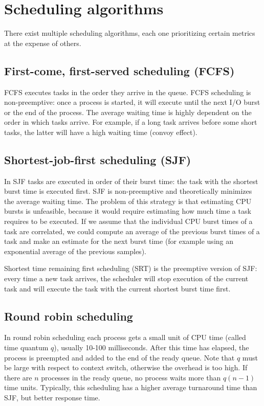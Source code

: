 \section{Scheduling algorithms}
There exist multiple scheduling algorithms, each one prioritizing certain metrics at the expense of others.
\subsection{First-come, first-served scheduling (FCFS)}
FCFS executes tasks in the order they arrive in the queue. FCFS scheduling is non-preemptive: once a process is started, it will execute until the next I/O burst or the end of the process. The average waiting time is highly dependent on the order in which tasks arrive. For example, if a long task arrives before some short tasks, the latter will have a high waiting time (convoy effect).
\subsection{Shortest-job-first scheduling (SJF)}
In SJF tasks are executed in order of their burst time: the task with the shortest burst time is executed first. SJF is non-preemptive and theoretically minimizes the average waiting time. The problem of this strategy is that estimating CPU bursts is unfeasible, because it would require estimating how much time a task requires to be executed. If we assume that the individual CPU burst times of a task are correlated, we could compute an average of the previous burst times of a task and make an estimate for the next burst time (for example using an exponential average of the previous samples).

Shortest time remaining first scheduling (SRT) is the preemptive version of SJF: every time a new task arrives, the scheduler will stop execution of the current task and will execute the task with the current shortest burst time first.

\subsection{Round robin scheduling}
In round robin scheduling each process gets a small unit of CPU time (called time quantum $q$), usually 10-100 milliseconds. After this time has elapsed, the process is preempted and added to the end of the ready queue. Note that $q$ must be large with respect to context switch, otherwise the overhead is too high. If there are $n$ processes in the ready queue, no process waits more than $q(n-1)$ time units. Typically, this scheduling has a higher average turnaround time than SJF, but better response time.

